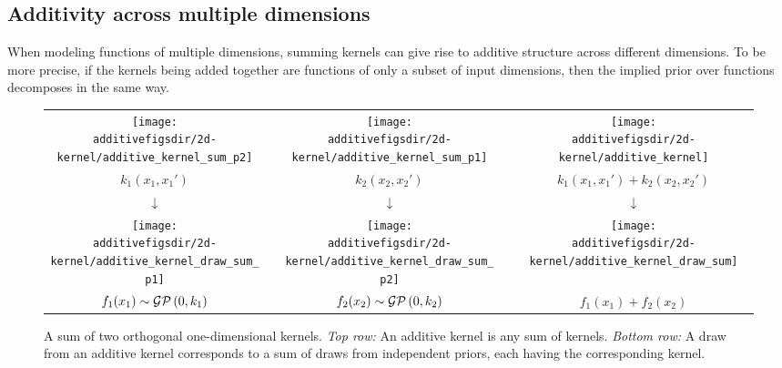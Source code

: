 \subsection{Additivity across multiple dimensions}
\label{sec:additivity-multiple-dimensions}

When modeling functions of multiple dimensions, summing kernels can give rise to additive structure across different dimensions.
To be more precise, if the kernels being added together are functions of only a subset of input dimensions, then the implied prior over functions decomposes in the same way.
%
\begin{figure}
\centering
\begin{tabular}{ccccc}
\hspace{-0.2cm}\texttt{[image: \\additivefigsdir/2d-kernel/additive\_kernel\_sum\_p2]} 
& \hspace{-0.4cm} \raisebox{1cm}{+} \hspace{-0.4cm} & 
\texttt{[image: \\additivefigsdir/2d-kernel/additive\_kernel\_sum\_p1]} 
& \hspace{-0.4cm} \raisebox{1cm}{=} \hspace{-0.4cm} & 
\texttt{[image: \\additivefigsdir/2d-kernel/additive\_kernel]} \\
$k_1(x_1, x_1')$ & & $k_2(x_2, x_2')$ & & $k_1(x_1,x_1') + k_2(x_2,x_2')$ \\[1em]
\large $\downarrow$ & & \large $\downarrow$ & & \large $\downarrow$ \\[-0.2em]
\hspace{-0.2cm}\texttt{[image: \\additivefigsdir/2d-kernel/additive\_kernel\_draw\_sum\_p1]}
& \hspace{-0.4cm} \raisebox{1cm}{+} \hspace{-0.4cm} & 
\texttt{[image: \\additivefigsdir/2d-kernel/additive\_kernel\_draw\_sum\_p2]}
& \hspace{-0.4cm} \raisebox{1cm}{=} \hspace{-0.4cm} &
\texttt{[image: \\additivefigsdir/2d-kernel/additive\_kernel\_draw\_sum]} \\
$f_1(x_1) \sim \mathcal{GP}\left(0, k_1\right)$ & & $f_2(x_2) \sim \mathcal{GP}\left(0, k_2\right)$ & & $f_1(x_1) + f_2(x_2)$ \\[1em]
\end{tabular}
\caption[Additive kernels correspond to additive functions]{
A sum of two orthogonal one-dimensional kernels.
\emph{Top row:} An additive kernel is any sum of kernels.
\emph{Bottom row:} A draw from an additive kernel corresponds to a sum of draws from independent \gp{} priors, each having the corresponding kernel.
}
\label{fig:sum-of-kernels}
\end{figure}

